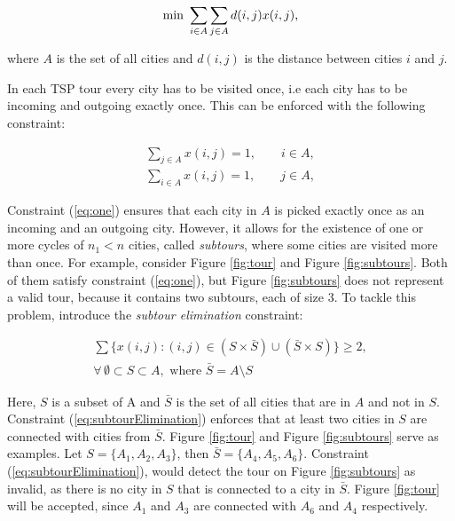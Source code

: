 \documentclass{mpaper}
\begin{document}
\vspace{-1mm}
\begin{equation}
\label{eq:objfunc}
\vspace{-1mm}
\textrm{min } \sum_{i\in A}\sum_{j\in A} d(i,j)x(i,j) \textrm{,}
\end{equation}

where $A$ is the set of all cities and $d(i,j)$ is the distance between cities $i$ and $j$.

In each TSP tour every city has to be visited once, i.e each city has to be incoming and outgoing exactly once. This can be enforced with the following constraint:

\vspace{-1mm}
\begin{equation}
\label{eq:one}
\begin{split}
  \sum_{j \in A} x(i,j) = 1, \qquad i \in A,\\
  \sum_{i \in A} x(i,j) = 1, \qquad j \in A,
\end{split}
\end{equation}
\vspace{-1mm}

Constraint (\ref{eq:one}) ensures that each city in $A$ is picked exactly once as an incoming and an outgoing city. However, it allows for the existence of one or more cycles of $n_{1} < n$ cities, called \textit{subtours}, where some cities are visited more than once. For example, consider Figure \ref{fig:tour} and Figure \ref{fig:subtours}. Both of them satisfy constraint (\ref{eq:one}), but Figure \ref{fig:subtours} does not represent a valid tour, because it contains two subtours, each of size 3. To tackle this problem, \cite{Dantzig54} introduce the \textit{subtour elimination} constraint:

\vspace{-1mm}
\begin{equation}
\label{eq:subtourElimination}
\begin{split}
\sum \{x(i,j) : (i,j) \in (S \times \bar{S}) \cup (\bar{S} \times S)\} \geq 2,\\ 
\forall \, \emptyset \subset S \subset A, \textrm{ where } \bar{S} = A \setminus S
\end{split}
\end{equation}
\vspace{-1mm}

Here, $S$ is a subset of A and $\bar{S}$ is the set of all cities that are in $A$ and not in $S$. Constraint (\ref{eq:subtourElimination}) enforces that at least two cities in $S$ are connected with cities from $\bar{S}$. Figure \ref{fig:tour} and Figure \ref{fig:subtours} serve as examples. Let $S = \{A_{1},A_{2},A_{3}\}$, then $\bar{S} = \{A_{4},A_{5},A_{6}\}$. Constraint (\ref{eq:subtourElimination}), would detect the tour on Figure \ref{fig:subtours} as invalid, as there is no city in $S$ that is connected to a city in $\bar{S}$. Figure \ref{fig:tour} will be accepted, since $A_{1}$ and $A_{3}$ are connected with $A_{6}$ and $A_{4}$ respectively.
\end{document}
